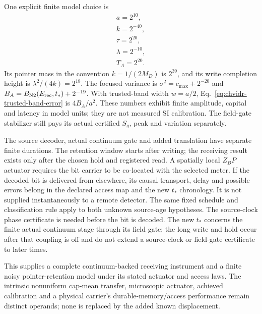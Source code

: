 One explicit finite model choice is
\begin{equation}\begin{gathered}
a=2^{10},\\
 k=2^{-40},\\
 \tau=2^{20},\\
 \lambda=2^{-10},\\
 T_A=2^{20}.
 \label{eq:chvidr-finite-translation-example}
\end{gathered}\end{equation}
Its pointer mass in the convention $k=1/(2M_D)$ is $2^{39}$, and its
write completion height is $\lambda^2/(4k)=2^{18}$. The focused variance
is $\sigma^2=c_{\max}+2^{-20}$ and
$B_A=B_{\rm N2}(E_{\rm rec},t_*)+2^{-19}$. With trusted-band width
$w=a/2$, Eq.~\eqref{eq:chvidr-trusted-band-error} is $4B_A/a^2$.
These numbers exhibit finite amplitude, capital and latency in model
units; they are not measured SI calibration. The field-gate stabilizer
still pays its actual certified $S_g$, peak and variation separately.

The source decoder, actual continuum gate and added translation have
separate finite durations. The retention window starts after writing;
the receiving result exists only after the chosen hold and registered
read. A spatially local $Z_BP$ actuator requires the bit carrier to be
co-located with the selected meter. If the decoded bit is delivered from
elsewhere, its causal transport, delay and possible errors belong in the
declared access map and the new $t_*$ chronology. It is not supplied
instantaneously to a remote detector. The same fixed schedule and
classification rule apply to both unknown source-age hypotheses.
The source-clock phase certificate is needed before the bit is decoded.
The new $t_*$ concerns the finite actual continuum stage through its field
gate; the long write and hold occur after that coupling is off and do not
extend a source-clock or field-gate certificate to later times.

This supplies a complete continuum-backed receiving instrument and a
finite noisy pointer-retention model under its stated actuator and access
laws. The intrinsic nonuniform cap-mean transfer, microscopic actuator,
achieved calibration and a physical carrier's durable-memory/access
performance remain distinct operands; none is replaced by the added
known displacement.

